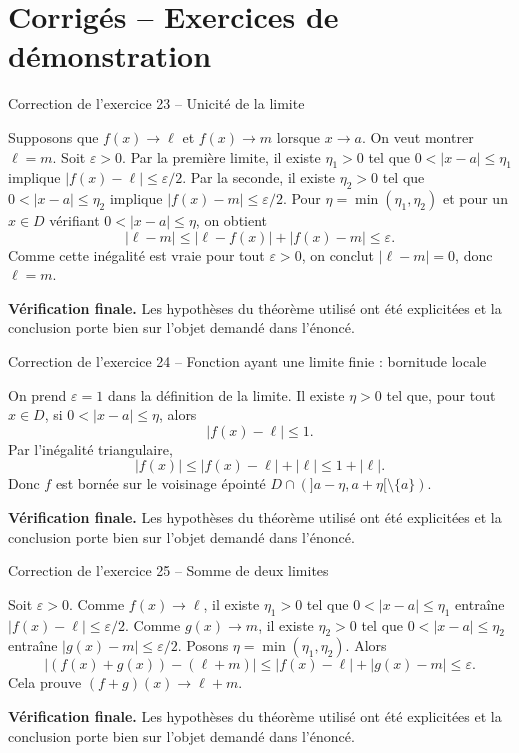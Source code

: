 \documentclass[11pt,a4paper]{article}
\begin{document}
\section{Corrigés -- Exercices de démonstration}
\begin{corrbox}{Correction de l'exercice 23 -- Unicité de la limite}

Supposons que $f(x)\to\ell$ et $f(x)\to m$ lorsque $x\to a$. On veut montrer $\ell=m$. Soit $\varepsilon>0$. Par la première limite, il existe $\eta_1>0$ tel que $0<|x-a|\leq\eta_1$ implique $|f(x)-\ell|\leq\varepsilon/2$. Par la seconde, il existe $\eta_2>0$ tel que $0<|x-a|\leq\eta_2$ implique $|f(x)-m|\leq\varepsilon/2$. Pour $\eta=\min(\eta_1,\eta_2)$ et pour un $x\in D$ vérifiant $0<|x-a|\leq\eta$, on obtient
\[
|\ell-m|\leq |\ell-f(x)|+|f(x)-m|\leq\varepsilon.
\]
Comme cette inégalité est vraie pour tout $\varepsilon>0$, on conclut $|\ell-m|=0$, donc $\ell=m$.

\medskip
\textbf{Vérification finale.} Les hypothèses du théorème utilisé ont été explicitées et la conclusion porte bien sur l'objet demandé dans l'énoncé.
\end{corrbox}


\begin{corrbox}{Correction de l'exercice 24 -- Fonction ayant une limite finie : bornitude locale}

On prend $\varepsilon=1$ dans la définition de la limite. Il existe $\eta>0$ tel que, pour tout $x\in D$, si $0<|x-a|\leq\eta$, alors
\[
|f(x)-\ell|\leq1.
\]
Par l'inégalité triangulaire,
\[
|f(x)|\leq |f(x)-\ell|+|\ell|\leq1+|\ell|.
\]
Donc $f$ est bornée sur le voisinage épointé $D\cap(]a-\eta,a+\eta[\setminus\{a\})$.

\medskip
\textbf{Vérification finale.} Les hypothèses du théorème utilisé ont été explicitées et la conclusion porte bien sur l'objet demandé dans l'énoncé.
\end{corrbox}


\begin{corrbox}{Correction de l'exercice 25 -- Somme de deux limites}

Soit $\varepsilon>0$. Comme $f(x)\to\ell$, il existe $\eta_1>0$ tel que $0<|x-a|\leq\eta_1$ entraîne $|f(x)-\ell|\leq\varepsilon/2$. Comme $g(x)\to m$, il existe $\eta_2>0$ tel que $0<|x-a|\leq\eta_2$ entraîne $|g(x)-m|\leq\varepsilon/2$. Posons $\eta=\min(\eta_1,\eta_2)$. Alors
\[
|(f(x)+g(x))-(\ell+m)|\leq |f(x)-\ell|+|g(x)-m|\leq\varepsilon.
\]
Cela prouve $(f+g)(x)\to\ell+m$.

\medskip
\textbf{Vérification finale.} Les hypothèses du théorème utilisé ont été explicitées et la conclusion porte bien sur l'objet demandé dans l'énoncé.
\end{corrbox}
\end{document}
